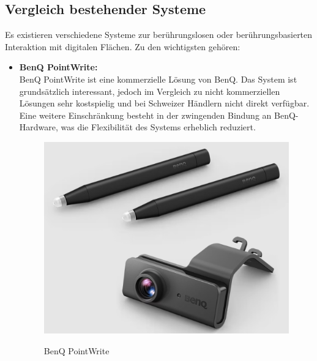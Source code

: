 \subsection{Vergleich bestehender Systeme}

Es existieren verschiedene Systeme zur berührungslosen oder berührungsbasierten Interaktion mit digitalen Flächen. Zu den wichtigsten gehören:

\begin{itemize}
  \item \textbf{BenQ PointWrite:}\\
  BenQ PointWrite ist eine kommerzielle Lösung von BenQ. Das System ist grundsätzlich interessant, jedoch im Vergleich zu nicht kommerziellen Lösungen sehr kostspielig und bei Schweizer Händlern nicht direkt verfügbar. Eine weitere Einschränkung besteht in der zwingenden Bindung an BenQ-Hardware, was die Flexibilität des Systems erheblich reduziert.\\
  \cite{benq_pointwrite}
  \begin{figure}[H]
      \centering
      \includegraphics[width=0.5\linewidth]{graphics/benq.png}
      \caption{BenQ PointWrite}
      \cite{benq_pointwrite}
      \label{fig:benq_pointwrite}
  \end{figure}
  \clearpage


\end{itemize}
